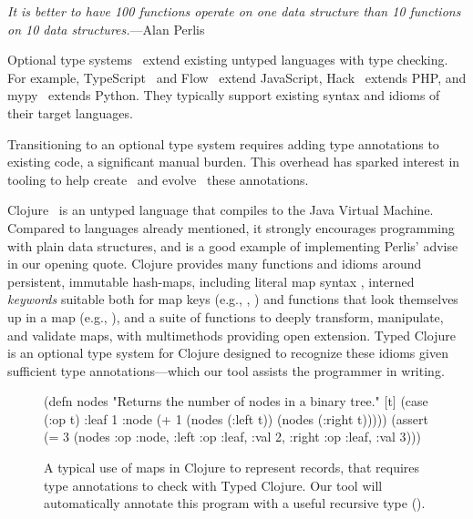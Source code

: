 
\emph{It is better to have 100 functions operate on one data structure than 10 functions on 10 data structures.}---Alan Perlis

Optional type systems~\cite{bracha2004pluggable} extend existing untyped languages
with type checking.
For example,
TypeScript~\cite{typescript} and Flow~\cite{flow} extend
JavaScript,
Hack~\cite{hack} extends PHP,
and
mypy~\cite{mypy} extends Python.
They typically support existing syntax and idioms of their target languages.

Transitioning to an optional type system
requires adding type annotations to existing code,
a significant manual burden.
This overhead has sparked interest in 
tooling to help create~\cite{saftoiu2010jstrace,pyannotate,typette18,An10dynamicinference,pytype} and
evolve~\cite{kristensen2017inference}
these annotations.

Clojure~\cite{Hic08} is an untyped language that compiles to the Java
Virtual Machine. Compared to languages already mentioned, it
strongly encourages programming with plain data structures, and is
a good example of implementing Perlis' advise in our opening quote.
Clojure provides
many functions and idioms around persistent, immutable hash-maps,
including literal map syntax , interned \emph{keywords}
suitable both for map keys (e.g., , ) and
functions that look themselves up in a map (e.g., ),
and a suite of functions to deeply transform, manipulate, and validate
maps, with multimethods providing open extension.
Typed Clojure~\cite{bonnaire2016practical} is an optional type system for Clojure
designed to recognize these idioms given sufficient type annotations---which our
tool assists the programmer in writing.

\begin{figure}
\begin{cljlisting}
(defn nodes
  "Returns the number of nodes in a binary tree."
  [t] (case (:op t)
        :leaf 1
        :node (+ 1 (nodes (:left t))
                   (nodes (:right t)))))
(assert (= 3 (nodes
               {:op :node,
                :left {:op :leaf, :val 2},
                :right {:op :leaf, :val 3}})))
\end{cljlisting}
\caption{A typical use of maps in Clojure
to represent records,
that requires type annotations
to check with Typed Clojure.
Our tool %
will automatically annotate this program
with a useful recursive type ().
}
\label{fig:infer:nodes}
\end{figure}

